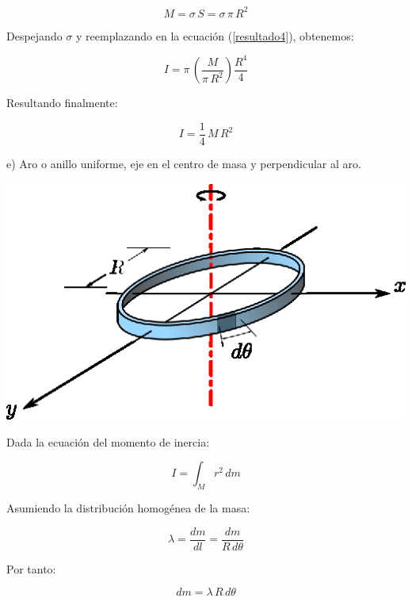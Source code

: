 \documentclass[letter,11pt]{article}
\begin{document}
\begin{equation*}
    M = \sigma\, S = \sigma\, \pi\, R^2
\end{equation*}

Despejando $\sigma$ y reemplazando en la ecuación (\ref{resultado4}), obtenemos:

\begin{equation*}
    I = \pi\, \left( \frac{M}{\pi\, R^2} \right) \frac{R^4}{4}
\end{equation*}

Resultando finalmente:

\begin{equation}
    I = \frac{1}{4}\, M\, R^2
\end{equation}

\newpage
e) Aro o anillo uniforme, eje en el centro de masa y perpendicular al aro.

\begin{center}
\includegraphics[scale=1.25]{resources/f5.eps}
\end{center}

Dada la ecuación del momento de inercia:

\begin{equation}
    I = \int_{M} r^2\, dm
\label{momentodeinercia5}
\end{equation}

Asumiendo la distribución homogénea de la masa:

\begin{equation*}
    \lambda = \frac{dm}{dl} = \frac{dm}{R\, d\theta}
\end{equation*}

Por tanto:

\begin{equation}
    dm = \lambda\, R\, d\theta
\label{dm5}
\end{equation}
\end{document}

